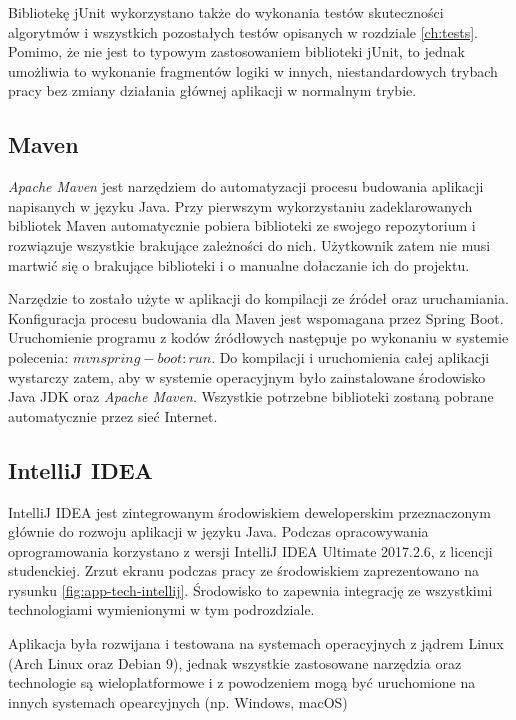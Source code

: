 Bibliotekę jUnit wykorzystano także do wykonania testów skuteczności algorytmów i wszystkich pozostałych testów opisanych w rozdziale \ref{ch:tests}. Pomimo, że nie jest to typowym zastosowaniem biblioteki jUnit, to jednak umożliwia to wykonanie fragmentów logiki w innych, niestandardowych trybach pracy bez zmiany działania głównej aplikacji w normalnym trybie.

\subsection{Maven}
{\it Apache Maven} jest narzędziem do automatyzacji procesu budowania aplikacji napisanych w języku Java.
Przy pierwszym wykorzystaniu zadeklarowanych bibliotek Maven automatycznie pobiera biblioteki ze swojego repozytorium i rozwiązuje wszystkie brakujące zależności do nich. Użytkownik zatem nie musi martwić się o brakujące biblioteki i o manualne dołaczanie ich do projektu.

Narzędzie to zostało użyte w aplikacji do kompilacji ze źródeł oraz uruchamiania. Konfiguracja procesu budowania dla Maven jest wspomagana przez Spring Boot. Uruchomienie programu z kodów źródłowych następuje po wykonaniu w systemie polecenia: $mvn spring-boot:run$.
Do kompilacji i uruchomienia całej aplikacji wystarczy zatem, aby w systemie operacyjnym było zainstalowane środowisko Java JDK oraz {\it Apache Maven}. Wszystkie potrzebne biblioteki zostaną pobrane automatycznie przez sieć Internet.

\subsection{IntelliJ IDEA}
IntelliJ IDEA jest zintegrowanym środowiskiem deweloperskim przeznaczonym głównie do rozwoju aplikacji w języku Java.
Podczas opracowywania oprogramowania korzystano z wersji IntelliJ IDEA Ultimate 2017.2.6, z licencji studenckiej. Zrzut ekranu podczas pracy ze środowiskiem zaprezentowano na rysunku \ref{fig:app-tech-intellij}.
Środowisko to zapewnia integrację ze wszystkimi technologiami wymienionymi w tym podrozdziale.

Aplikacja była rozwijana i testowana na systemach operacyjnych z jądrem Linux (Arch Linux oraz Debian 9), jednak wszystkie zastosowane narzędzia oraz technologie są wieloplatformowe i z powodzeniem mogą być uruchomione na innych systemach opearcyjnych (np. Windows, macOS)

